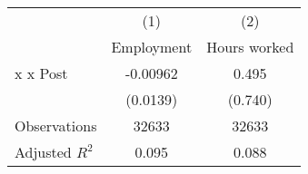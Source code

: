 {
\def\sym#1{\ifmmode^{#1}\else\(^{#1}\)\fi}
\begin{tabular}{l*{2}{c}}
\hline\hline
                &\multicolumn{1}{c}{(1)}&\multicolumn{1}{c}{(2)}\\
                &\multicolumn{1}{c}{Employment}&\multicolumn{1}{c}{Hours worked}\\
\hline
 x  x Post      & -0.00962         &    0.495         \\
                & (0.0139)         &  (0.740)         \\
\hline
Observations    &    32633         &    32633         \\
Adjusted \(R^{2}\)&    0.095         &    0.088         \\
\hline\hline
\end{tabular}
}
